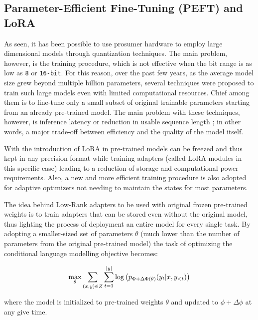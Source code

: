 \subsection{Parameter-Efficient Fine-Tuning (PEFT) and LoRA}
\label{chapter:LORA}


As seen, it has been possible to use prosumer hardware to employ large dimensional models through quantization techniques. The main problem, however, is the training procedure, which is not effective when the bit range is as low as \texttt{8} or \texttt{16-bit}. For this reason, over the past few years, as the average model size grew beyond multiple billion parameters, several techniques were proposed to train such large models even with limited computational resources. Chief among them is to fine-tune only a small subset of original trainable parameters starting from an already pre-trained model. The main problem with these techniques, however, is inference latency \citep{houlsby2019parameterefficient} or reduction in usable sequence length \citep{lester2021power, hambardzumyan2021warp}; in other words, a major trade-off between efficiency and the quality of the model itself.

With the introduction of LoRA in \citet{hu2021lora} pre-trained models can be freezed and thus kept in any precision format while training adapters (called LoRA modules in this specific case) leading to a reduction of storage and computational power requirements. Also, a new and more efficient training procedure is also adopted for adaptive optimizers not needing to maintain the states for most parameters.


The idea behind Low-Rank adapters to be used with original frozen pre-trained weights is to train adapters that can be stored even without the original model, thus lighting the process of deployment an entire model for every single task. By adopting a smaller-sized set of parameters $\theta$ (much lower than the number of parameters from the original pre-trained model) the task of optimizing the conditional language modelling objective becomes:

\begin{equation*}
\centering
    \max_{\theta} \sum_{(x, y) \in Z} \sum_{t = 1}^{|y|} \log \left( p_{\Phi + \Delta \Phi(\theta)} (y_t | x, y_{< t}) \right)
\end{equation*}

where the model is initialized to pre-trained weights $\theta$ and updated to $\phi + \Delta \phi$ at any give time.

